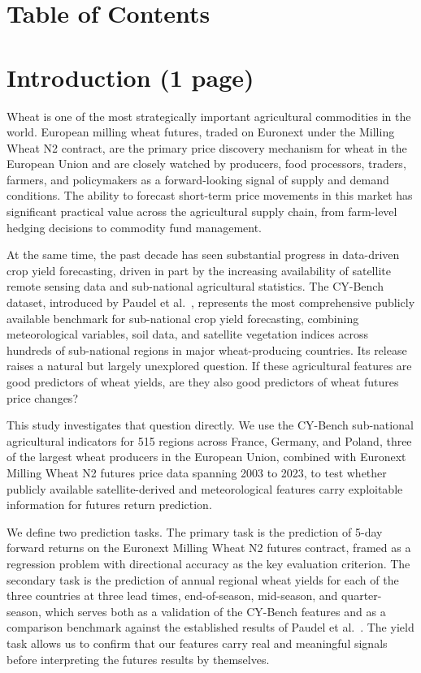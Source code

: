 \documentclass[pdflatex,sn-mathphys-num, oneside]{sn-jnl}%
\theoremstyle{thmstyleone}%
\theoremstyle{thmstyletwo}%
\theoremstyle{thmstylethree}%
\begin{document}
\clearpage

\section{Table of Contents}\label{sec2}

\clearpage

\section{Introduction (1 page)}\label{sec3}
Wheat is one of the most strategically important agricultural commodities in the world. European milling wheat futures, traded on Euronext under the Milling Wheat N2 contract, are the primary price discovery mechanism for wheat in the European Union and are closely watched by producers, food processors, traders, farmers, and policymakers as a forward-looking signal of supply and demand conditions. The ability to forecast short-term price movements in this market has significant practical value across the agricultural supply chain, from farm-level hedging decisions to commodity fund management.

At the same time, the past decade has seen substantial progress in data-driven crop yield forecasting, driven in part by the increasing availability of satellite remote sensing data and sub-national agricultural statistics. The CY-Bench dataset, introduced by Paudel et al.~\cite{bib17}, represents the most comprehensive publicly available benchmark for sub-national crop yield forecasting, combining meteorological variables, soil data, and satellite vegetation indices across hundreds of sub-national regions in major wheat-producing countries. Its release raises a natural but largely unexplored question. If these agricultural features are good predictors of wheat yields, are they also good predictors of wheat futures price changes?

This study investigates that question directly. We use the CY-Bench sub-national agricultural indicators for 515 regions across France, Germany, and Poland, three of the largest wheat producers in the European Union, combined with Euronext Milling Wheat N2 futures price data spanning 2003 to 2023, to test whether publicly available satellite-derived and meteorological features carry exploitable information for futures return prediction. 

We define two prediction tasks. The primary task is the prediction of 5-day forward returns on the Euronext Milling Wheat N2 futures contract, framed as a regression problem with directional accuracy as the key evaluation criterion. The secondary task is the prediction of annual regional wheat yields for each of the three countries at three lead times, end-of-season, mid-season, and quarter-season, which serves both as a validation of the CY-Bench features and as a comparison benchmark against the established results of Paudel et al.~\cite{bib16,bib17}. The yield task allows us to confirm that our features carry real and meaningful signals before interpreting the futures results by themselves.
\end{document}
